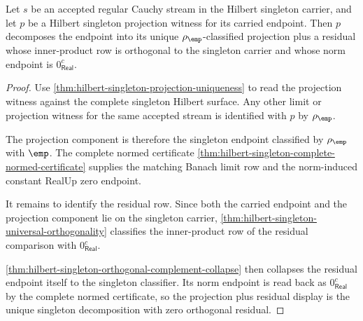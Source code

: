 \begin{theorem}
\label{thm:hilbert-singleton-projection-residual-decomposition}
Let $s$ be an accepted regular Cauchy stream in the Hilbert singleton carrier,
and let $p$ be a Hilbert singleton projection witness for its carried
endpoint. Then $p$ decomposes the endpoint into its unique
$\rho_{\emp}$-classified projection plus a residual whose inner-product row is
orthogonal to the singleton carrier and whose norm endpoint is
$0_{\mathsf{Real}}^{c}$.
\end{theorem}
\begin{proof}
Use \autoref{thm:hilbert-singleton-projection-uniqueness} to read the
projection witness against the complete singleton Hilbert surface. Any other
limit or projection witness for the same accepted stream is identified with
$p$ by $\rho_{\emp}$.

The projection component is therefore the singleton endpoint classified by
$\rho_{\emp}$ with $\emp$. The complete normed certificate
\autoref{thm:hilbert-singleton-complete-normed-certificate} supplies the
matching Banach limit row and the norm-induced constant RealUp zero endpoint.

It remains to identify the residual row. Since both the carried endpoint and
the projection component lie on the singleton carrier,
\autoref{thm:hilbert-singleton-universal-orthogonality} classifies the
inner-product row of the residual comparison with $0_{\mathsf{Real}}^{c}$.

\autoref{thm:hilbert-singleton-orthogonal-complement-collapse} then collapses
the residual endpoint itself to the singleton classifier. Its norm endpoint is
read back as $0_{\mathsf{Real}}^{c}$ by the complete normed certificate, so
the projection plus residual display is the unique singleton decomposition
with zero orthogonal residual.
\end{proof}
